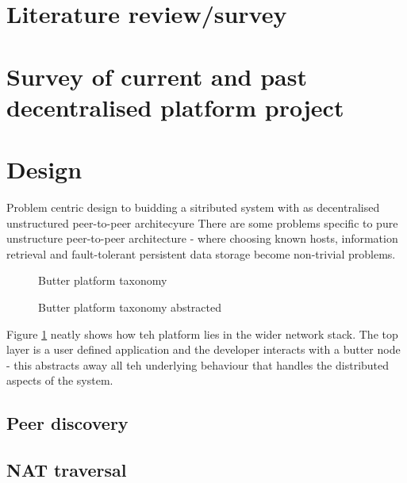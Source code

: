 \documentclass[a4paper]{article}
\begin{document}
\section{Literature review/survey}
\section{Survey of current and past decentralised platform project}

\section{Design}
Problem centric design to buidding a sitributed system with as decentralised unstructured peer-to-peer architecyure
There are some problems specific to pure unstructure peer-to-peer architecture - where choosing known hosts, information retrieval and fault-tolerant persistent data storage become non-trivial problems.

\begin{figure}
    \centering
    
    \caption{Butter platform taxonomy}
    \label{fig:butter-platform-taxonomy}
\end{figure}

\begin{figure}
    \centering
    
    \caption{Butter platform taxonomy abstracted}
    \label{fig:butter-platform-taxonomy-abstracted}
\end{figure}

Figure \ref{fig:butter-platform-taxonomy} neatly shows how teh platform lies in the wider network stack. The top layer is a user defined application and the developer interacts with a butter node - this abstracts away all teh underlying behaviour that handles the distributed aspects of the system. 

\subsection{Peer discovery}
\subsection{NAT traversal}
\end{document}
